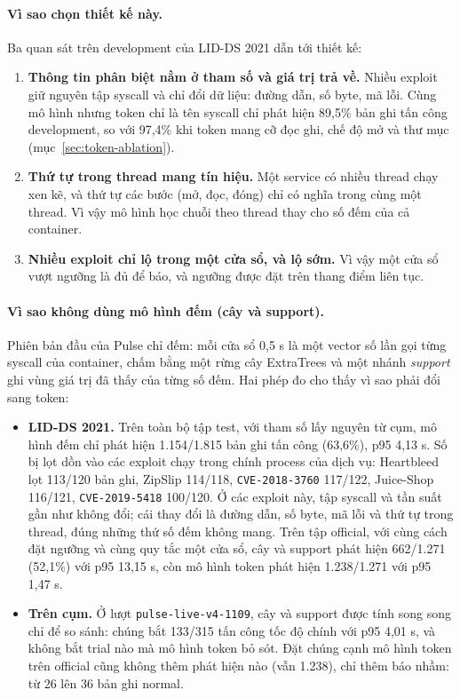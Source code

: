 \paragraph{Vì sao chọn thiết kế này.} Ba quan sát trên development của LID-DS 2021 dẫn tới thiết kế:

\begin{enumerate}
\tightlist
\item
  \textbf{Thông tin phân biệt nằm ở tham số và giá trị trả về.} Nhiều exploit giữ nguyên tập syscall và chỉ đổi dữ liệu: đường dẫn, số byte, mã lỗi. Cùng mô hình nhưng token chỉ là tên syscall chỉ phát hiện 89,5\% bản ghi tấn công development, so với 97,4\% khi token mang cỡ đọc ghi, chế độ mở và thư mục (mục~\ref{sec:token-ablation}).
\item
  \textbf{Thứ tự trong thread mang tín hiệu.} Một service có nhiều thread chạy xen kẽ, và thứ tự các bước (mở, đọc, đóng) chỉ có nghĩa trong cùng một thread. Vì vậy mô hình học chuỗi theo thread thay cho số đếm của cả container.
\item
  \textbf{Nhiều exploit chỉ lộ trong một cửa sổ, và lộ sớm.} Vì vậy một cửa sổ vượt ngưỡng là đủ để báo, và ngưỡng được đặt trên thang điểm liên tục.
\end{enumerate}

\paragraph{Vì sao không dùng mô hình đếm (cây và support).} Phiên bản đầu của Pulse chỉ đếm: mỗi cửa sổ 0,5 s là một vector số lần gọi từng syscall của container, chấm bằng một rừng cây ExtraTrees \citep{geurts2006} và một nhánh \emph{support} ghi vùng giá trị đã thấy của từng số đếm. Hai phép đo cho thấy vì sao phải đổi sang token:

\begin{itemize}
\tightlist
\item
  \textbf{LID-DS 2021.} Trên toàn bộ tập test, với tham số lấy nguyên từ cụm, mô hình đếm chỉ phát hiện 1.154/1.815 bản ghi tấn công (63,6\%), p95 4,13 s. Số bị lọt dồn vào các exploit chạy trong chính process của dịch vụ: Heartbleed lọt 113/120 bản ghi, ZipSlip 114/118, \texttt{CVE-\allowbreak{}2018-\allowbreak{}3760} 117/122, Juice-Shop 116/121, \texttt{CVE-\allowbreak{}2019-\allowbreak{}5418} 100/120. Ở các exploit này, tập syscall và tần suất gần như không đổi; cái thay đổi là đường dẫn, số byte, mã lỗi và thứ tự trong thread, đúng những thứ số đếm không mang. Trên tập official, với cùng cách đặt ngưỡng và cùng quy tắc một cửa sổ, cây và support phát hiện 662/1.271 (52,1\%) với p95 13,15 s, còn mô hình token phát hiện 1.238/1.271 với p95 1,47 s.
\item
  \textbf{Trên cụm.} Ở lượt \texttt{pulse-\allowbreak{}live-\allowbreak{}v4-\allowbreak{}1109}, cây và support được tính song song chỉ để so sánh: chúng bắt 133/315 tấn công tốc độ chính với p95 4,01 s, và không bắt trial nào mà mô hình token bỏ sót. Đặt chúng cạnh mô hình token trên official cũng không thêm phát hiện nào (vẫn 1.238), chỉ thêm báo nhầm: từ 26 lên 36 bản ghi normal.
\end{itemize}

